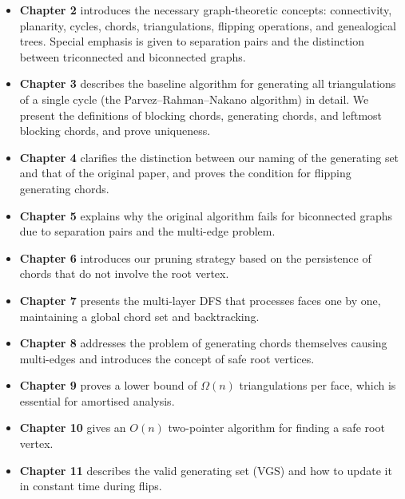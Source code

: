 \begin{itemize}
    \item \textbf{Chapter 2} introduces the necessary graph-theoretic concepts: connectivity, planarity, cycles, chords, triangulations, flipping operations, and genealogical trees. 
    Special emphasis is given to separation pairs and the distinction between triconnected and biconnected graphs.
    
    \item \textbf{Chapter 3} describes the baseline algorithm for generating all triangulations of a single cycle (the Parvez–Rahman–Nakano algorithm) in detail. 
    We present the definitions of blocking chords, generating chords, and leftmost blocking chords, and prove uniqueness.
    
    \item \textbf{Chapter 4} clarifies the distinction between our naming of the generating set and that of the original paper, and proves the condition for flipping generating chords.
    
    \item \textbf{Chapter 5} explains why the original algorithm fails for biconnected graphs due to separation pairs and the multi-edge problem.
    
    \item \textbf{Chapter 6} introduces our pruning strategy based on the persistence of chords that do not involve the root vertex.
    
    \item \textbf{Chapter 7} presents the multi-layer DFS that processes faces one by one, maintaining a global chord set and backtracking.
    
    \item \textbf{Chapter 8} addresses the problem of generating chords themselves causing multi-edges and introduces the concept of safe root vertices.
    
    \item \textbf{Chapter 9} proves a lower bound of \(\Omega(n)\) triangulations per face, which is essential for amortised analysis.
    
    \item \textbf{Chapter 10} gives an \(O(n)\) two-pointer algorithm for finding a safe root vertex.
    
    \item \textbf{Chapter 11} describes the valid generating set (VGS) and how to update it in constant time during flips.
    

\end{itemize}
